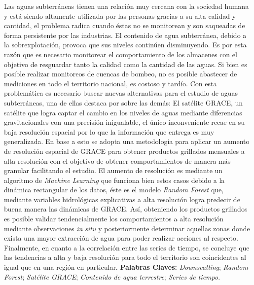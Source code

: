 Las aguas subterráneas tienen una relación muy cercana con la sociedad humana y está siendo altamente utilizada por las personas gracias a su
alta calidad y cantidad, el problema radica cuando éstas no se monitorean y son saqueadas de forma persistente por las industrias. El contenido de agua
subterránea, debido a la sobrexplotación, provoca que sus niveles continúen disminuyendo. Es por esta razón que es necesario monitorear el comportamiento de 
los almacenes con el objetivo de resguardar tanto la calidad como la cantidad de las aguas. Si bien es posible realizar monitoreos de cuencas de bombeo, no es 
posible abastecer de mediciones en todo el territorio nacional, es costoso y tardío. Con esta problemática es necesario buscar nuevas alternativas para el estudio de 
aguas subterráneas, una de ellas destaca por sobre las demás: El satélite GRACE, un satélite que logra captar el cambio en los niveles de aguas mediante diferencias gravitacionales con una precisión inigualable,
el único inconveniente recae en su baja resolución espacial por lo que la información que entrega es muy
generalizada. En base a esto se adopta una metodología para aplicar un aumento de resolución espacial de GRACE para obtener productos grillados mensuales a alta resolución con el 
objetivo de obtener comportamientos de manera más granular facilitando el estudio. El aumento de resolución es mediante un algoritmo de \textit{Machine Learning} que funciona bien estos casos 
debido a la dinámica rectangular de los datos, éste es el modelo \textit{Random Forest} que, mediante variables hidrológicas explicativas a alta resolución logra predecir de buena manera 
las dinámicas de GRACE. Así, obteniendo los productos grillados es posible validar tendencialmente
los comportamientos a alta resolución mediante observaciones \textit{in situ} y posteriormente determinar aquellas zonas donde exista una mayor extracción de agua para poder realizar acciones al respecto.
Finalmente, en cuanto a la correlación entre las series de tiempo, se concluye que las tendencias a alta y baja resolución para todo el territorio son coincidentes al igual que en una región en particular.
\vskip 0.2in
\noindent
{\bf Palabras Claves:} \textit{Downscalling}; \textit{Random Forest}; \textit{Satélite GRACE}; \textit{Contenido de agua terrestre}; \textit{Series de tiempo}.